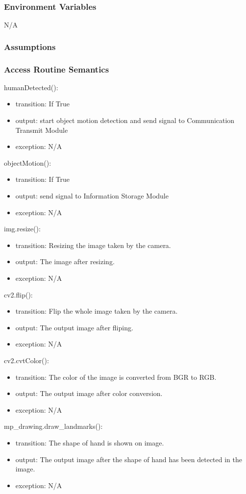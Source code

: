 \documentclass[12pt, titlepage]{article}
\begin{document}
\subsubsection{Environment Variables}

N/A


\subsubsection{Assumptions}


\subsubsection{Access Routine Semantics}

\noindent humanDetected():
\begin{itemize}
\item transition: If True 
\item output: start object motion detection and send signal to Communication Transmit Module
\item exception: N/A
\end{itemize}
\noindent objectMotion():
\begin{itemize}
\item transition: If True 
\item output: send signal to Information Storage Module 
\item exception: N/A
\end{itemize}
\noindent img.resize():
\begin{itemize}
\item transition: Resizing the image taken by the camera. 
\item output: The image after resizing.
\item exception: N/A
\end{itemize}
\noindent cv2.flip():
\begin{itemize}
\item transition: Flip the whole image taken by the camera.
\item output: The output image after fliping.
\item exception: N/A
\end{itemize}
\noindent cv2.cvtColor():
\begin{itemize}
\item transition: The color of the image is converted from BGR to RGB.
\item output: The output image after color conversion.
\item exception: N/A
\end{itemize}
\noindent mp\_drawing.draw\_landmarks():
\begin{itemize}
\item transition: The shape of hand is shown on image.
\item output: The output image after the shape of hand has been detected in the image.
\item exception: N/A
\end{itemize}
\end{document}
